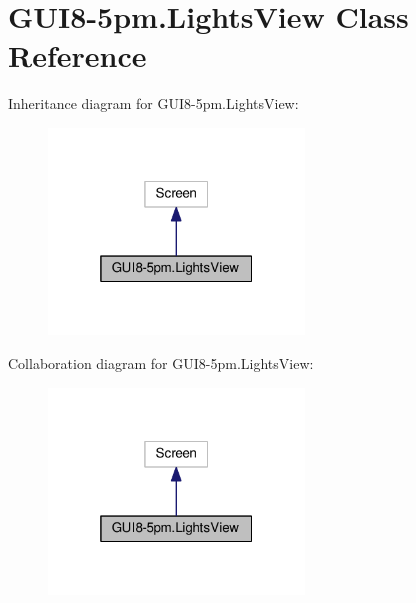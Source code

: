 \hypertarget{classGUI8-5pm_1_1LightsView}{}\section{G\+U\+I8-\/5pm.Lights\+View Class Reference}
\label{classGUI8-5pm_1_1LightsView}


Inheritance diagram for G\+U\+I8-\/5pm.Lights\+View\+:
\nopagebreak
\begin{figure}[H]
\begin{center}
\leavevmode
\includegraphics[width=193pt]{classGUI8-5pm_1_1LightsView__inherit__graph}
\end{center}
\end{figure}


Collaboration diagram for G\+U\+I8-\/5pm.Lights\+View\+:
\nopagebreak
\begin{figure}[H]
\begin{center}
\leavevmode
\includegraphics[width=193pt]{classGUI8-5pm_1_1LightsView__coll__graph}
\end{center}
\end{figure}
